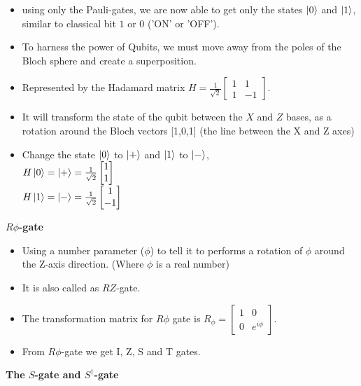 \documentclass{article}
\begin{document}
\begin{itemize}
    \item using only the Pauli-gates, we are now able to get only the states $\ket{0}$ and $\ket{1}$, similar to classical bit $1$ or $0$ ('ON' or 'OFF').
    \item To harness the power of Qubits, we must move away from the poles of the Bloch sphere and create a superposition.
    \item Represented by the Hadamard matrix 
$H = \frac{1}{\sqrt{2}}\begin{bmatrix} 1 & 1 \\ 1 & -1 \end{bmatrix}$.
     \item It will transform the state of the qubit between the $X$ and $Z$ bases, as a rotation around the Bloch vectors [1,0,1] (the line between the X and Z axes)
    \item Change the state $\ket{0}$ to $\ket{+}$ and $\ket{1}$ to $\ket{-}$,\\
    \vspace{0.2cm}
$H\ket{0} = \ket{+} = \frac{1}{\sqrt{2}}\begin{bmatrix}1 \\1 \end{bmatrix}$ \\
$H\ket{1} = \ket{-} = \frac{1}{\sqrt{2}}\begin{bmatrix}1 \\-1 \end{bmatrix}$
\end{itemize}
\newpage
\large{\textbf{$R\phi$-gate}}
\begin{itemize}
    \item Using a number parameter ($\phi$) to tell it to performs a rotation of $\phi$ around the Z-axis direction. (Where $\phi$ is a real number)
    \item It is also called as $RZ$-gate.
    \item The transformation matrix for $R\phi$ gate is 
    $R_{\phi} = \begin{bmatrix} 1 & 0 \\ 0 & e^{i\phi} \end{bmatrix}$.
    \item From $R\phi$-gate we get I, Z, S and T gates.
\end{itemize}       
\textbf{The $S$-gate and $S^{\dagger}$-gate}
\end{document}
